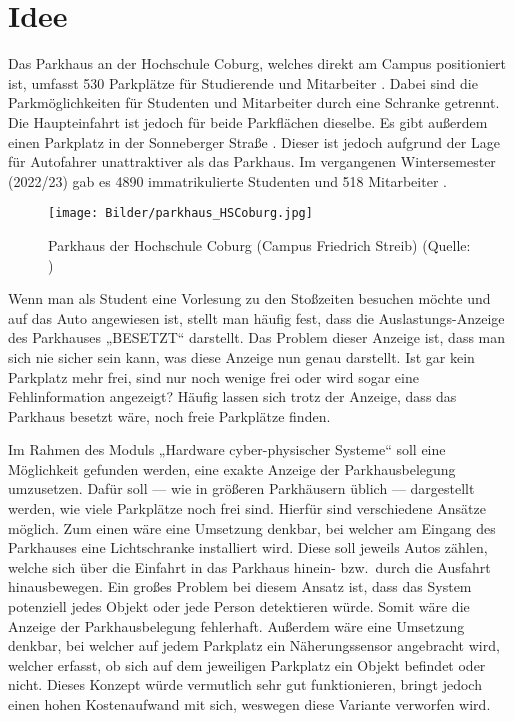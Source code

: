 \section{Idee}\label{ch:Einleitung}
Das Parkhaus an der Hochschule Coburg, welches direkt am Campus positioniert ist, umfasst 530 Parkplätze für Studierende und Mitarbeiter \cite{parkhaus}.
Dabei sind die Parkmöglichkeiten für Studenten und Mitarbeiter durch eine Schranke getrennt.
Die Haupteinfahrt ist jedoch für beide Parkflächen dieselbe.
Es gibt außerdem einen Parkplatz in der Sonneberger Straße \cite{anfahrt}.
Dieser ist jedoch aufgrund der Lage für Autofahrer unattraktiver als das Parkhaus.
Im vergangenen Wintersemester (2022/23) gab es 4890 immatrikulierte Studenten und 518 Mitarbeiter \cite{HSCoburgZahlen}.

\begin{figure}[h]
	\myImagePos{}
	\texttt{[image: Bilder/parkhaus\_HSCoburg.jpg]}
	\caption[Parkhaus der Hochschule Coburg]{Parkhaus der Hochschule Coburg (Campus Friedrich Streib) (Quelle: \cite{parkhaus})}
	\label{fig:Parkhaus}
\end{figure}

Wenn man als Student eine Vorlesung zu den Stoßzeiten besuchen möchte und auf das Auto angewiesen ist, stellt man häufig fest, dass die Auslastungs-Anzeige des Parkhauses „BESETZT“ darstellt.
Das Problem dieser Anzeige ist, dass man sich nie sicher sein kann, was diese Anzeige nun genau darstellt.
Ist gar kein Parkplatz mehr frei, sind nur noch wenige frei oder wird sogar eine Fehlinformation angezeigt?
Häufig lassen sich trotz der Anzeige, dass das Parkhaus besetzt wäre, noch freie Parkplätze finden.

Im Rahmen des Moduls „Hardware cyber-physischer Systeme“ soll eine Möglichkeit gefunden werden, eine exakte Anzeige der Parkhausbelegung umzusetzen.
Dafür soll --- wie in größeren Parkhäusern üblich --- dargestellt werden, wie viele Parkplätze noch frei sind.
Hierfür sind verschiedene Ansätze möglich.
Zum einen wäre eine Umsetzung denkbar, bei welcher am Eingang des Parkhauses eine Lichtschranke installiert wird.
Diese soll jeweils Autos zählen, welche sich über die Einfahrt in das Parkhaus hinein- bzw.\ durch die Ausfahrt hinausbewegen.
Ein großes Problem bei diesem Ansatz ist, dass das System potenziell jedes Objekt oder jede Person detektieren würde.
Somit wäre die Anzeige der Parkhausbelegung fehlerhaft.
Außerdem wäre eine Umsetzung denkbar, bei welcher auf jedem Parkplatz ein Näherungssensor angebracht wird, welcher erfasst, ob sich auf dem jeweiligen Parkplatz ein Objekt befindet oder nicht.
Dieses Konzept würde vermutlich sehr gut funktionieren, bringt jedoch einen hohen Kostenaufwand mit sich, weswegen diese Variante verworfen wird.

